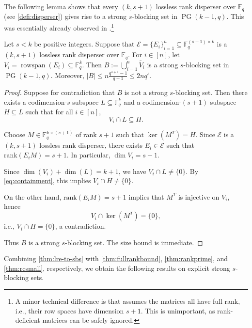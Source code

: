 \documentclass[11pt]{article}
\newcommand{\rank}{\mathrm{rank}}
\newcommand{\F}{\mathbb{F}}
\DeclareMathOperator{\rowspan}{rowspan}
\DeclareMathOperator{\PG}{PG}
\begin{document}
The following lemma shows that every $(k,s+1)$ lossless rank disperser over $\F_q$ (see \cref{defi:disperser}) gives rise to a strong $s$-blocking set in $\PG(k-1,q)$. This was essentially already observed in \cite[Proposition~10]{FZ16}.\footnote{A minor technical difference is that \cite[Proposition~10]{FZ16} assumes the matrices all have full rank, i.e., their row spaces have dimension $s+1$. This is unimportant, as rank-deficient matrices can be safely ignored.}

\begin{lemma}\label{thm:lre-to-sbs}
Let $s<k$ be positive integers.
Suppose that $\mathcal E=\{E_i\}_{i=1}^n\subseteq \F_q^{(s+1)\times k}$ is a $(k,s+1)$ lossless rank disperser over $\F_q$. For $i\in[n]$, let $V_i=\rowspan(E_i)\subseteq \F_q^k$. Then $B:=\bigcup_{i=1}^n \widetilde{V_i}$ is a strong $s$-blocking set in $\PG(k-1,q)$. Moreover, $|B|\le n\frac{q^{s+1}-1}{q-1}\le 2nq^s$.
\end{lemma}

\begin{proof}
Suppose for contradiction that $B$ is not a strong $s$-blocking set. Then there exists a codimension-$s$ subspace $L\subseteq \F_q^k$ and a codimension-$(s+1)$ subspace $H\subseteq L$ such that for all $i\in [n]$,
\begin{equation}\label{eq:containment}
V_i \cap L \subseteq H.
\end{equation}

Choose $M\in \F_q^{k\times (s+1)}$ of rank $s+1$ such that $\ker(M^T)=H$. Since $\mathcal E$ is a $(k,s+1)$ lossless rank disperser, there exists $E_i\in \mathcal E$ such that $\rank(E_iM)=s+1$. In particular, $\dim V_i=s+1$.

Since $\dim(V_i)+\dim(L)=k+1$, we have $V_i\cap L\neq\{0\}$. By \eqref{eq:containment}, this implies $V_i\cap H\neq\{0\}$.

On the other hand, $\rank(E_iM)=s+1$ implies that $M^T$ is injective on $V_i$, hence
\[
V_i \cap \ker(M^T)=\{0\},
\]
i.e., $V_i \cap H=\{0\}$, a contradiction.

Thus $B$ is a strong $s$-blocking set. The size bound is immediate.
\end{proof}

Combining \cref{thm:lre-to-sbs} with \cref{thm:fullrankbound}, \cref{thm:rankprime}, and \cref{thm:rcsmall}, respectively, we obtain the following results on explicit strong $s$-blocking sets.
\end{document}
